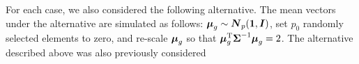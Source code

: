 \documentclass[alpha-refs]{wiley-article}
\theoremstyle{plain}%
\theoremstyle{definition}
\def\trace{\hbox{trace}}
\def\trace{\hbox{trace}}
\def\trans{^{\rm T}}
\newcommand{\uI}       {\mbox{\boldmath$I$}}
\newcommand{\uN}       {\mbox{\boldmath$N$}}
\newcommand{\umu}               {\mbox{\boldmath$\mu$}}
\newcommand{\uSigma}            {\mbox{\boldmath$\Sigma$}}
\begin{document}
For each case, we also considered the following alternative. The mean vectors under the alternative are simulated as follows:
 $\umu_g \sim \uN_{p}(\bf{1}, \uI)$, set $p_0$ randomly selected elements to zero, and re-scale $\umu_g$ so that $\umu_g \trans\uSigma ^{-1}  \umu_g = 2$.
The alternative described above was also previously considered \cite{srivastava2014raptt,zoh2018powerful} %
\end{document}
